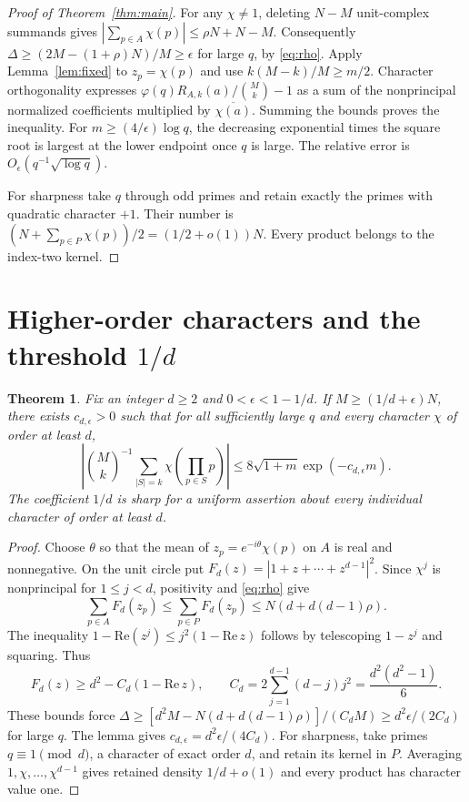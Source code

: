 \documentclass[11pt]{article}
\newtheorem{theorem}{Theorem}
\theoremstyle{remark}\newtheorem*{remark}{Remark}
\begin{document}
\begin{proof}[Proof of Theorem~\ref{thm:main}]
For any $\chi\ne1$, deleting $N-M$ unit-complex summands gives $|\sum_{p\in A}\chi(p)|\le\rho N+N-M$. Consequently $\Delta\ge(2M-(1+\rho)N)/M\ge\epsilon$ for large $q$, by \eqref{eq:rho}. Apply Lemma~\ref{lem:fixed} to $z_p=\chi(p)$ and use $k(M-k)/M\ge m/2$. Character orthogonality expresses $\varphi(q)R_{A,k}(a)/\binom Mk-1$ as a sum of the nonprincipal normalized coefficients multiplied by $\overline{\chi(a)}$. Summing the bounds proves the inequality. For $m\ge(4/\epsilon)\log q$, the decreasing exponential times the square root is largest at the lower endpoint once $q$ is large. The relative error is $O_\epsilon(q^{-1}\sqrt{\log q})$.

For sharpness take $q$ through odd primes and retain exactly the primes with quadratic character $+1$. Their number is $(N+\sum_{p\in P}\chi(p))/2=(1/2+o(1))N$. Every product belongs to the index-two kernel.
\end{proof}

\section{Higher-order characters and the threshold \texorpdfstring{$1/d$}{1/d}}
\begin{theorem}\label{thm:higher}
Fix an integer $d\ge2$ and $0<\epsilon<1-1/d$. If $M\ge(1/d+\epsilon)N$, there exists $c_{d,\epsilon}>0$ such that for all sufficiently large $q$ and every character $\chi$ of order at least $d$,
\[
 \left|\binom Mk^{-1}\sum_{|S|=k}\chi\!\left(\prod_{p\in S}p\right)\right|
 \le 8\sqrt{1+m}\exp(-c_{d,\epsilon}m).
\]
The coefficient $1/d$ is sharp for a uniform assertion about every individual character of order at least $d$.
\end{theorem}
\begin{proof}
Choose $\theta$ so that the mean of $z_p=e^{-i\theta}\chi(p)$ on $A$ is real and nonnegative. On the unit circle put $F_d(z)=|1+z+\cdots+z^{d-1}|^2$.
Since $\chi^j$ is nonprincipal for $1\le j<d$, positivity and \eqref{eq:rho} give
\[
 \sum_{p\in A}F_d(z_p)\le\sum_{p\in P}F_d(z_p)
 \le N(d+d(d-1)\rho).
\]
The inequality $1-\mathrm{Re}(z^j)\le j^2(1-\mathrm{Re}\,z)$ follows by telescoping $1-z^j$ and squaring. Thus
\[
 F_d(z)\ge d^2-C_d(1-\mathrm{Re}\,z),\qquad
 C_d=2\sum_{j=1}^{d-1}(d-j)j^2=\frac{d^2(d^2-1)}6.
\]
These bounds force $\Delta\ge[d^2 M-N(d+d(d-1)\rho)]/(C_dM)\ge d^2\epsilon/(2C_d)$ for large $q$. The lemma gives $c_{d,\epsilon}=d^2\epsilon/(4C_d)$. For sharpness, take primes $q\equiv1\pmod d$, a character of exact order $d$, and retain its kernel in $P$. Averaging $1,\chi,\ldots,\chi^{d-1}$ gives retained density $1/d+o(1)$ and every product has character value one.
\end{proof}
\end{document}
